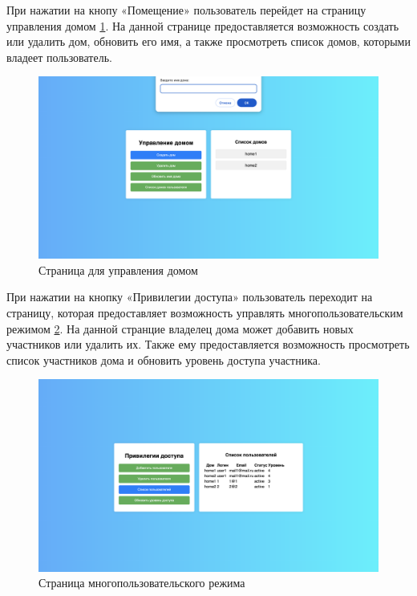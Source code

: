 При нажатии на кнопу «Помещение» пользователь перейдет на страницу управления домом \ref{img:home}. На данной странице 
предоставляется возможность создать или удалить дом, обновить его имя, а также просмотреть список домов, которыми владеет 
пользователь. 

\begin{figure}[H]
    \includegraphics[width=1\linewidth]{img/home.png}
    \caption{\label{img:home} Страница для управления домом}
\end{figure}
\noindent

При нажатии на кнопку «Привилегии доступа» пользователь переходит на страницу, которая предоставляет возможность
управлять многопользовательским режимом \ref{img:access}. На данной странцие владелец дома может
добавить новых участников или удалить их. Также ему предоставляется возможность
просмотреть список участников дома и обновить уровень доступа участника.

\begin{figure}[H]
    \includegraphics[width=1\linewidth]{img/access.png}
    \caption{\label{img:access} Страница многопользовательского режима}
\end{figure}
\noindent

